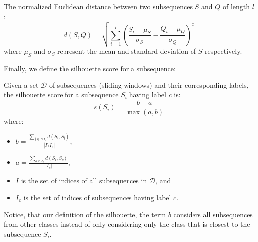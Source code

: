 \documentclass[sigconf, nonacm]{acmart}
\begin{document}
\begin{definition}
	The normalized Euclidean distance between two subsequences $S$ and $Q$ of
	length $l$:
	$$d(S, Q) = \sqrt{\sum_{i=1}^l (\frac{S_i - \mu_S}{\sigma_S} - \frac{Q_i -
				\mu_Q}{\sigma_Q})^2}$$
	where $\mu_S$ and $\sigma_S$ represent the mean and standard deviation of
	$S$ respectively.
\end{definition}

Finally, we define the silhouette score for a subsequence:

\begin{definition}
	Given a set $\mathcal{D}$ of subsequences (sliding windows) and their
	corresponding labels, the silhouette score for a subsequence $S_i$ having label
	$c$ is:
	$$
		s(S_i) = \frac{b - a}{\max{(a, b)}}
	$$
	where:
	\begin{itemize}
		\item $b = \frac{\sum_{j \in I \setminus I_c}d(S_i, S_j)}{|I \setminus I_c|}$,
		\item $a = \frac{\sum_{k \in I_c}d(S_i, S_k)}{|I_c|}$,
		\item $I$ is the set of indices of all subsequences in $\mathcal{D}$, and
		\item $I_c$ is the set of indices of subsequences having label $c$.
	\end{itemize}
\end{definition}

Notice, that our definition of the silhouette, the term $b$ considers all 
subsequences from other classes instead of only considering only the class that
is closest to the subsequence $S_i$.





\end{document}
